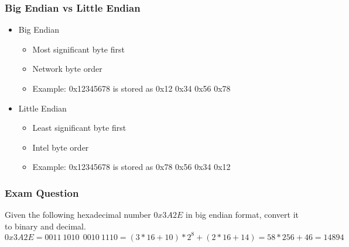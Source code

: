 \begin{frame}
    \frametitle{Big Endian vs Little Endian}
    \begin{itemize}
        \item Big Endian
        \begin{itemize}
            \item Most significant byte first
            \item Network byte order
            \item Example: 0x12345678 is stored as 0x12 0x34 0x56 0x78
        \end{itemize}
        \item Little Endian
        \begin{itemize}
            \item Least significant byte first
            \item Intel byte order
            \item Example: 0x12345678 is stored as 0x78 0x56 0x34 0x12
        \end{itemize}
    \end{itemize}
\end{frame}




\begin{frame}
    \frametitle{Exam Question}
    Given the following hexadecimal number $0x3A2E$ in big endian format, convert it to binary and decimal.
    $0x3A2E = 0011\ 1010\ \ 0010\ 1110 = (3 * 16 + 10) * 2^8 + (2 * 16 + 14) = 58 * 256 + 46 = 14894$
\end{frame}
